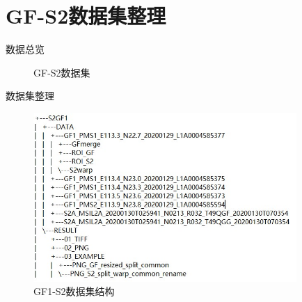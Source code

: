 \section{GF-S2数据集整理}
\begin{frame}{数据总览}
    \begin{figure}[!htbp]
        \centering
        \quad
        \caption{{\tiny GF-S2数据集}}
        \label{fig:0101}
    \end{figure}
\end{frame}

\begin{frame}{数据集整理}
    \begin{figure}
        \centering
        \includegraphics[width=10cm]{pic/pic0102gf1.jpg}
        \caption{GF1-S2数据集结构}
        \label{fig:0102a}
    \end{figure}
\end{frame}


